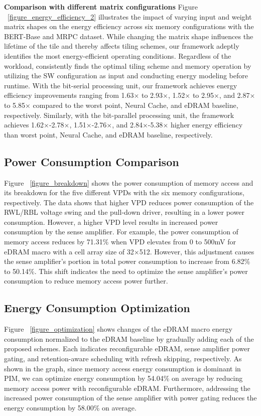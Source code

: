 \textbf{Comparison with different matrix configurations}
Figure ~\ref{figure_energy_efficiency_2} illustrates the impact of varying input and weight matrix shapes on the energy efficiency across six memory configurations with the BERT-Base and MRPC dataset. While changing the matrix shape influences the lifetime of the tile and thereby affects tiling schemes, our framework adeptly identifies the most energy-efficient operating conditions. Regardless of the workload, \sysname consistently finds the optimal tiling scheme and memory operation by utilizing the SW configuration as input and conducting energy modeling before runtime. With the bit-serial processing unit, our framework achieves energy efficiency improvements ranging from 1.63$\times$ to 2.93$\times$, 1.52$\times$ to 2.95$\times$, and 2.87$\times$ to 5.85$\times$ compared to the worst point, Neural Cache, and eDRAM baseline, respectively. Similarly, with the bit-parallel processing unit, the framework achieves 1.62$\times$-2.78$\times$, 1.51$\times$-2.76$\times$, and 2.84$\times$-5.38$\times$ higher energy efficiency than worst point, Neural Cache, and eDRAM baseline, respectively.


\subsection{Power Consumption Comparison}

Figure ~\ref{figure_breakdown} shows the power consumption of memory access and its breakdown for the five different VPDs with the six memory configurations, respectively. The data shows that higher VPD reduces power consumption of the RWL/RBL voltage swing and the pull-down driver, resulting in a lower power consumption. However, a higher VPD level results in increased power consumption by the sense amplifier. For example, the power consumption of memory access reduces by 71.31\% when VPD elevates from 0 to 500mV for eDRAM macro with a cell array size of 32$\times$512. However, this adjustment causes the sense amplifier’s portion in total power consumption to increase from 6.82\% to 50.14\%. This shift indicates the need to optimize the sense amplifier’s power consumption to reduce memory access power further.



\subsection{Energy Consumption Optimization}
Figure ~\ref{figure_optimization} shows changes of the eDRAM macro energy consumption normalized to the eDRAM baseline by gradually adding each of the proposed schemes. Each indicates reconfigurable eDRAM, sense amplifier power gating, and retention-aware scheduling with refresh skipping, respectively. As shown in the graph, since memory access energy consumption is dominant in PIM, we can optimize energy consumption by 54.04\% on average by reducing memory access power with reconfigurable eDRAM. Furthermore, addressing the increased power consumption of the sense amplifier with power gating reduces the energy consumption by 58.00\% on average.

